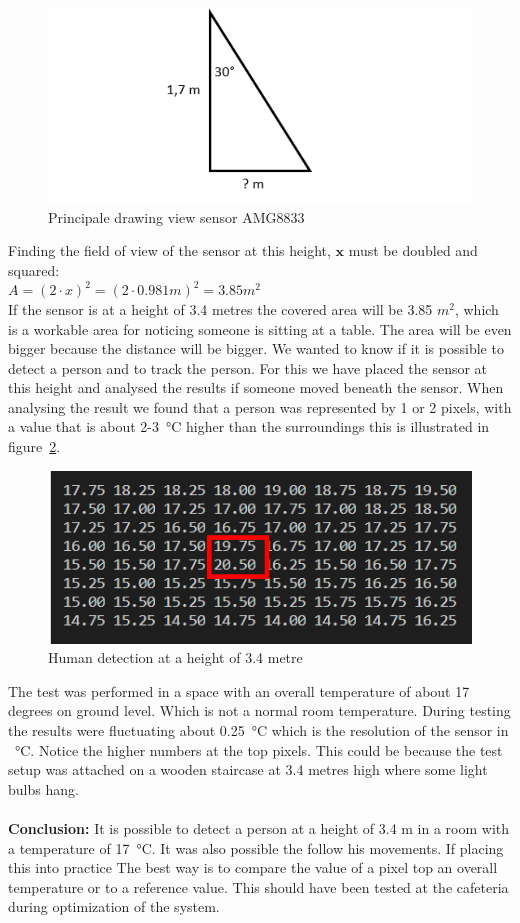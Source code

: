 \documentclass[11pt,a4paper]{article}
\begin{document}
\begin{figure}[H]
	\centering
	\includegraphics[width=0.8\linewidth]{field_of_view_AMG8833.png}
	\caption{Principale drawing view sensor AMG8833}
	\label{fig:prinicipal drawing}
\end{figure}
Finding the field of view of the sensor at this height, $\textbf{x}$ must be doubled and squared:\\
$ A = (2 \cdot x)^2 = (2 \cdot 0.981 m)^2 =  3.85 m^2$
\\
If the sensor is at a height of 3.4 metres the covered area will be 3.85 $m^2$, which is a workable area for noticing someone is sitting at a table.
The area will be even bigger because the distance will be bigger. We wanted to know if it is possible to detect a person and to track the person.
For this we have placed the sensor at this height and analysed the results if someone moved beneath the sensor. When analysing the result we found that a person was represented by 1 or 2 pixels, with a value that is about 2-\SI{3}{\celsius} higher than the surroundings this is illustrated in figure~\ref{fig:humandetection}. 
\begin{figure}[H]
	\centering
	\includegraphics[width=0.8\linewidth]{humandetection.png}
	\caption{Human detection at a height of 3.4 metre}
	\label{fig:humandetection}
\end{figure}
The test was performed in a space with an overall temperature of about 17 degrees on ground level. Which is not a normal room temperature. During testing the results were fluctuating about \SI{0.25}{\celsius} which is the resolution of the sensor in \SI{}{\celsius}. Notice the higher numbers at the top pixels. This could be because the test setup was attached on a wooden staircase at 3.4 metres high where some light bulbs hang.\\ \\
\textbf{Conclusion:} It is possible to detect a person at a height of 3.4 m in a room with a temperature of \SI{17}{\celsius}. It was also possible the follow his movements. If placing this into practice The best way is to compare the value of a pixel top an overall temperature or to a reference value. This should have been tested at the cafeteria during optimization of the system.
\end{document}
